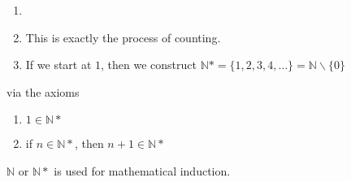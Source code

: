 \documentclass[10pt]{article}
\begin{document}
	\begin{description}
		\item[Remarks:]
		\begin{enumerate}
			\item[]
			\item This is exactly the process of counting.
			\item If we start at $1$, then we construct $\mathbb{N}* = \{1, 2, 3, 4, \dots\} = \mathbb{N} \backslash \{0\}$
		\end{enumerate}
		\item via the axioms
		\begin{enumerate}
			\item $1 \in \mathbb{N}*$
			\item if $n \in \mathbb{N}*$, then $n+1 \in \mathbb{N}*$
		\end{enumerate}
		\item $\mathbb{N}$ or $\mathbb{N}*$ is used for mathematical induction.
	\end{description}
	
\end{document}
